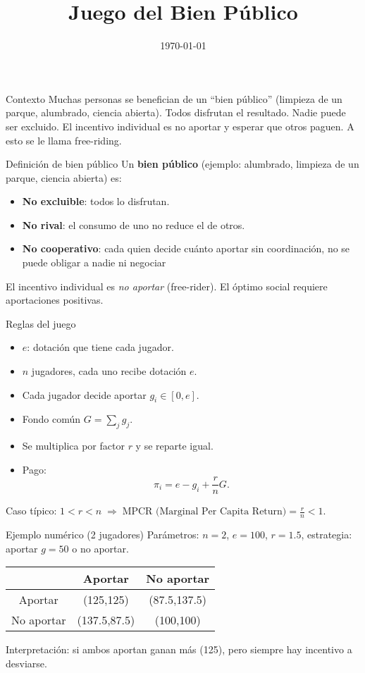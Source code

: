 \documentclass[aspectratio=169]{beamer}
\title{Juego del Bien Público}
\author{}
\date{\today}
\begin{document}
\begin{frame}
  \titlepage
\end{frame}

\begin{frame}{Contexto}
Muchas personas se benefician de un “bien público” (limpieza de un parque, alumbrado, ciencia abierta). Todos disfrutan el resultado. Nadie puede ser excluido. El incentivo individual es no aportar y esperar que otros paguen. A esto se le llama free-riding.
\end{frame}

\begin{frame}{Definición de bien público}
Un \textbf{bien público} (ejemplo: alumbrado, limpieza de un parque, ciencia abierta) es:
\begin{itemize}
  \item \textbf{No excluible}: todos lo disfrutan.
  \item \textbf{No rival}: el consumo de uno no reduce el de otros.
  \item \textbf{No cooperativo}: cada quien decide cuánto aportar sin coordinación, no se puede obligar a nadie ni negociar
\end{itemize}
El incentivo individual es \emph{no aportar} (free-rider).  
El óptimo social requiere aportaciones positivas.
\end{frame}

\begin{frame}{Reglas del juego}
\begin{itemize}
  \item $e$: dotación que tiene cada jugador.
  \item $n$ jugadores, cada uno recibe dotación $e$.
  \item Cada jugador decide aportar $g_i \in [0,e]$.
  \item Fondo común $G = \sum_j g_j$.
  \item Se multiplica por factor $r$ y se reparte igual.
  \item Pago:
  \[
  \pi_i = e - g_i + \frac{r}{n}G.
  \]
\end{itemize}
Caso típico: $1<r<n \;\Rightarrow\; \text{MPCR (Marginal Per Capita Return)}=\tfrac{r}{n}<1$.
\end{frame}

\begin{frame}{Ejemplo numérico (2 jugadores)}
Parámetros: $n=2$, $e=100$, $r=1.5$, estrategia: aportar $g=50$ o no aportar.  
\begin{center}
\begin{tabular}{c|cc}
 & Aportar & No aportar \\\hline
Aportar & (125,125) & (87.5,137.5) \\
No aportar & (137.5,87.5) & (100,100) \\
\end{tabular}
\end{center}
Interpretación: si ambos aportan ganan más (125), pero siempre hay incentivo a desviarse.
\end{frame}
\end{document}
